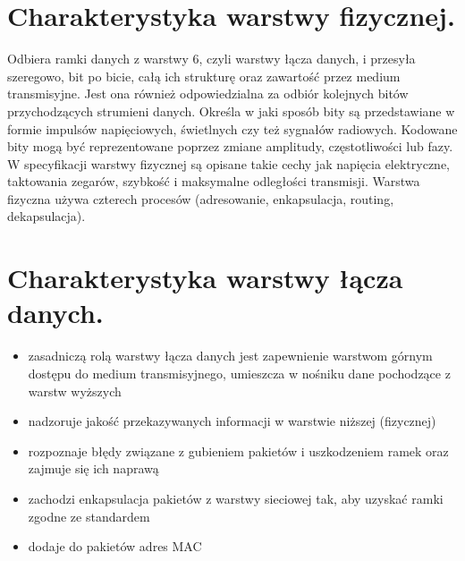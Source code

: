 \documentclass[12pt,a4paper]{article}
\begin{document}
	\section{Charakterystyka warstwy fizycznej.}
	Odbiera ramki danych z warstwy 6, czyli warstwy łącza danych, i przesyła szeregowo, bit po bicie, całą ich strukturę oraz zawartość przez medium transmisyjne. Jest ona również odpowiedzialna za odbiór kolejnych bitów przychodzących strumieni danych. Określa w jaki sposób bity są przedstawiane w formie impulsów napięciowych, świetlnych czy też sygnałów radiowych. Kodowane bity mogą być reprezentowane poprzez zmiane amplitudy, częstotliwości lub fazy.\\	
	W specyfikacji warstwy fizycznej są opisane takie cechy jak napięcia elektryczne, taktowania zegarów, szybkość i maksymalne odległości transmisji. Warstwa fizyczna używa czterech procesów (adresowanie, enkapsulacja, routing, dekapsulacja).

	\section{Charakterystyka warstwy łącza danych.}
	\begin{itemize}
		\item zasadniczą rolą warstwy łącza danych jest zapewnienie warstwom górnym dostępu do medium transmisyjnego, umieszcza w nośniku dane pochodzące z warstw wyższych
		\item nadzoruje jakość przekazywanych informacji w warstwie niższej (fizycznej)
		\item rozpoznaje błędy związane z gubieniem pakietów i uszkodzeniem ramek oraz zajmuje się ich naprawą
		\item zachodzi enkapsulacja pakietów z warstwy sieciowej tak, aby uzyskać ramki zgodne ze standardem
		\item dodaje do pakietów adres MAC
	\end{itemize}
\end{document}
